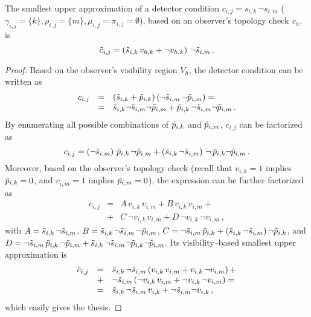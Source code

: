 \begin{proposition}
\label{prop:mixed-atom}
The smallest upper approximation of a detector condition $c_{i,j}=s_{i,k} \, \neg s_{i,m}$ ($\gamma_{i,j}=\{k\}, \rho_{i,j}=\{m\}, \mu_{i,j}=\pi_{i,j}=\emptyset$), based on an observer's topology check $v_h$, is
$$
\tilde{c}_{i,j} = \left(  \tilde{s}_{i,k} \, v_{h,k} + \neg v_{h,k} \right) \, \neg \tilde{s}_{i,m} \, .
$$
\begin{proof}
Based on the observer's visibility region $V_h$, the detector condition can be written as 
\begin{equation*}
\begin{array}{rcl}
c_{i,j} & = & (\tilde{s}_{i,k} + \tilde{p}_{i,k}) \, (\neg \tilde{s}_{i,m} \, \neg \tilde{p}_{i,m}) = \\
& = & \tilde{s}_{i,k} \neg \tilde{s}_{i,m} \neg \tilde{p}_{i,m} + \tilde{p}_{i,k} \, \neg \tilde{s}_{i,m} \neg \tilde{p}_{i,m} \, . 
\end{array}
\end{equation*}
By enumerating all possible combinations of $\tilde{p}_{i,k}$ and $\tilde{p}_{i,m}$, $c_{i,j}$ can be factorized as
\begin{equation*}
c_{i,j} = \left( \neg \tilde{s}_{i,m} \right) \, \tilde{p}_{i,k} \, \neg \tilde{p}_{i,m} + \left(\tilde{s}_{i,k} \, \neg  \tilde{s}_{i,m} \right) \, \neg \, \tilde{p}_{i,k} \neg  \tilde{p}_{i,m} \, .
\end{equation*}
Moreover, based on the observer's topology check (recall that $v_{i,k}=1$ implies $\tilde{p}_{i,k}=0$, and $v_{i,m}=1$ implies $\tilde{p}_{i,m}=0$), the expression can be further factorized as
\begin{equation*}
\begin{array}{rcl}
c_{i,j} & = & A \, v_{i,k} \, v_{i,m} + B \, v_{i,k} \, v_{i,m} + \\
& + & C \, \neg v_{i,k} \, v_{i,m} + D \, \neg v_{i,k} \, \neg v_{i,m} \, ,
\end{array}
\end{equation*}
with $A=\tilde{s}_{i,k} \, \neg \tilde{s}_{i,m}$, $B=\tilde{s}_{i,k} \, \neg \tilde{s}_{i,m} \, \neg\tilde{p}_{i,m}$, $C=\neg \tilde{s}_{i,m} \, \tilde{p}_{i,k} + (\tilde{s}_{i,k} \, \neg \tilde{s}_{i,m}) \, \neg \tilde{p}_{i,k}$, and $D=\neg \tilde{s}_{i,m} \, \tilde{p}_{i,k} \, \neg \tilde{p}_{i,m} + \tilde{s}_{i,k} \, \neg \tilde{s}_{i,m} \neg \tilde{p}_{i,k} \neg \tilde{p}_{i,m}$. Its visibility--based smallest upper approximation is
\begin{equation*}
\begin{array}{rcl}
\tilde{c}_{i,j} & = & \tilde{s}_{i,k} \, \neg \tilde{s}_{i,m} \left( v_{i,k} \, v_{i,m} + v_{i,k} \, \neg v_{i,m} \right) + \\
& + & \neg \tilde{s}_{i,m} \left( \neg v_{i,k} \, v_{i,m} + \neg v_{i,k} \, \neg v_{i,m} \right) = \\
& = & \tilde{s}_{i,k} \, \neg \tilde{s}_{i,m} \, v_{i,k}  + \neg \tilde{s}_{i,m} \neg v_{i,k} \, ,
\end{array}
\end{equation*}
which easily gives the thesis.
\end{proof}
\end{proposition}

